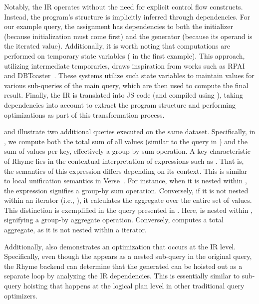 \documentclass[runningheads]{llncs}
\newcommand{\lang}{Rhyme}
\begin{document}
Notably, the IR operates without the need for explicit control flow constructs.
Instead, the program's structure is implicitly inferred through dependencies.
For our example query, the assignment  has dependencies to
both the initializer (because initialization must come first) and the generator
(because its operand is the iterated value).
Additionally, it is worth noting that computations are performed on temporary
state variables ( in the first example).
This approach, utilizing intermediate temporaries, draws inspiration from works
such as RPAI~\cite{rpai} and DBToaster~\cite{dbtoaster_vldb}.
These systems utilize such state variables to maintain values for
various sub-queries of the main query, which are then used to compute the
final result.
Finally, the IR is translated into JS code (and compiled using ),
taking dependencies into account to extract the program structure and performing
optimizations as part of this transformation process.

 and  illustrate two additional queries executed on
the same dataset.
Specifically, in , we compute both the total sum of all values
(similar to the query in ) and the sum of values per key, effectively
a group-by sum operation.
A key characteristic of \lang{} lies in the contextual interpretation of expressions
such as .
That is, the semantics of this expression differs depending on its context.
This is similar to local unification semantics in Verse~\cite{verse}.
For instance, when it is nested within ,
the expression signifies a group-by sum operation.
Conversely, if it is not nested within an iterator (i.e., \inline{*}),
it calculates the aggregate over the entire set of values.
This distinction is exemplified in the query presented in .
Here,  is nested within , signifying a
group-by aggregate operation.
Conversely,  computes a total aggregate, as it is not nested
within a  iterator.

Additionally,  also demonstrates an optimization that occurs at the IR level.
Specifically, even though the  appears as a nested sub-query
in the original query, the \lang{} backend can determine that the generated
 can be hoisted out as a separate loop by analyzing the IR dependencies.
This is essentially similar to sub-query hoisting that happens at the logical plan level
in other traditional query optimizers.
\end{document}
